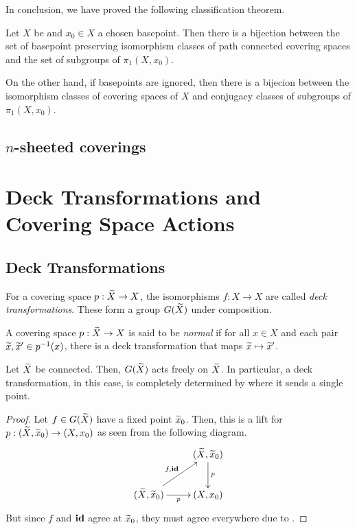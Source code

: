 In conclusion, we have proved the following classification theorem.

\begin{theorem}
    Let $X$ be \nice and $x_0\in X$ a chosen basepoint. Then there is a bijection between the set of basepoint preserving isomorphism classes of path connected covering spaces and the set of subgroups of $\pi_1(X,x_0)$. 

    On the other hand, if basepoints are ignored, then there is a bijecion between the isomorphism classes of covering spaces of $X$ and conjugacy classes of subgroups of $\pi_1(X,x_0)$.
\end{theorem}

\subsection{\texorpdfstring{$n$}{n}-sheeted coverings}

\section{Deck Transformations and Covering Space Actions}

\subsection{Deck Transformations}
\begin{definition}
    For a covering space $p:\widetilde{X}\to X$, the isomorphisms $f: X\to X$ are called \textit{deck transformations}. These form a group $G(\widetilde{X})$ under composition. 

    A covering space $p:\widetilde{X}\to X$ is said to be \textit{normal} if for all $x\in X$ and each pair $\widetilde{x},\widetilde{x}'\in p^{-1}(x)$, there is a deck transformation that maps $\widetilde{x}\mapsto\widetilde{x}'$.
\end{definition}

\begin{proposition}
    Let $\widetilde{X}$ be connected. Then, $G(\widetilde{X})$ acts freely on $\widetilde{X}$. In particular, a deck transformation, in this case, is completely determined by where it sends a single point.
\end{proposition}
\begin{proof}
    Let $f\in G(\widetilde{X})$ have a fixed point $\widetilde{x}_0$. Then, this is a lift for $p:(\widetilde{X}, \widetilde{x}_0)\to(X,x_0)$ as seen from the following diagram. 
    \begin{equation*}
        \xymatrix {
            & (\wt X, \wt x_0)\ar[d]^p\\
            (\wt X,\wt x_0)\ar[r]_p\ar[ru]^{f,\id} & (X,x_0)
        }
    \end{equation*}
    But since $f$ and $\mathbf{id}$ agree at $\widetilde{x}_0$, they must agree everywhere due to .
\end{proof}

